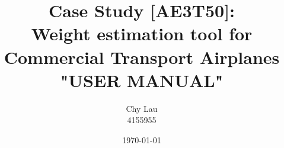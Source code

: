 \documentclass[10pt]{article}
\begin{document}
\title{\textbf{Case Study [AE3T50]: \\Weight estimation tool for Commercial Transport Airplanes\\ "USER MANUAL"}}
\date{\today}
\author{Chy Lau\\ 4155955}
\maketitle
\thispagestyle{empty}
\clearpage

\tableofcontents
\thispagestyle{empty}
\clearpage
\setcounter{page}{1}
 \clearpage

%
%
% 
\end{document}
